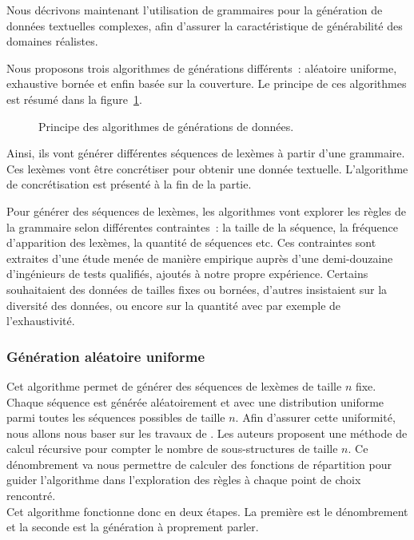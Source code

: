 Nous décrivons maintenant l'utilisation de grammaires pour la génération de
données textuelles complexes, afin d'assurer la caractéristique de générabilité
des domaines réalistes.

Nous proposons trois algorithmes de générations différents~: aléatoire uniforme,
exhaustive bornée et enfin basée sur la couverture. Le principe de ces
algorithmes est résumé dans la figure~\ref{figure:data:grammar}.
%
\begin{figure}


\caption{\label{figure:data:grammar} Principe des algorithmes de générations de
données.}

\end{figure}
%
Ainsi, ils vont générer différentes séquences de lexèmes à partir d'une
grammaire. Ces lexèmes vont être concrétiser pour obtenir une donnée
textuelle. L'algorithme de concrétisation est présenté à la fin de la partie.

Pour générer des séquences de lexèmes, les algorithmes vont explorer les règles
de la grammaire selon différentes contraintes~: la taille de la séquence, la
fréquence d'apparition des lexèmes, la quantité de séquences etc. Ces
contraintes sont extraites d'une étude menée de manière empirique auprès d'une
demi-douzaine d'ingénieurs de tests qualifiés, ajoutés à notre propre
expérience. Certains souhaitaient des données de tailles fixes ou bornées,
d'autres insistaient sur la diversité des données, ou encore sur la quantité
avec par exemple de l'exhaustivité.

\subsubsection{Génération aléatoire uniforme}
\label{subsection:data:random_uniform_generation}

Cet algorithme permet de générer des séquences de lexèmes de taille $n$ fixe.
Chaque séquence est générée aléatoirement et avec une distribution uniforme
parmi toutes les séquences possibles de taille $n$. Afin d'assurer cette
uniformité, nous allons nous baser sur les travaux de . Les
auteurs proposent une méthode de calcul récursive pour compter le nombre de
sous-structures de taille $n$. Ce dénombrement va nous permettre de calculer des
fonctions de répartition pour guider l'algorithme dans l'exploration des règles
à chaque point de choix rencontré. \\
Cet algorithme fonctionne donc en deux étapes. La première est le dénombrement
et la seconde est la génération à proprement parler.

